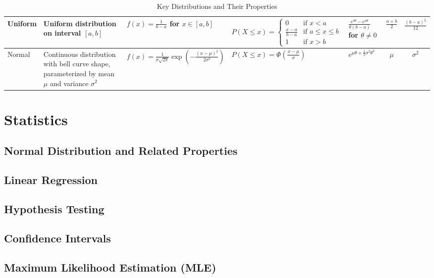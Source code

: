 \documentclass{article}
\begin{document}
\begin{table}[h]
\begin{tabular}{|l|p{3.5cm}|p{3.5cm}|p{3.5cm}|p{2.5cm}|c|c|}
\hline
Uniform &
Uniform distribution on interval $[a,b]$ &
$f(x) = \frac{1}{b-a}$ for $x \in [a,b]$ &
$P(X \leq x) = \begin{cases}
0 & \text{if } x < a \\
\frac{x-a}{b-a} & \text{if } a \leq x \leq b \\
1 & \text{if } x > b
\end{cases}$ &
$\frac{e^{b\theta} - e^{a\theta}}{\theta(b-a)}$ for $\theta \neq 0$ &
$\frac{a+b}{2}$ &
$\frac{(b-a)^2}{12}$ \\
\hline
Normal &
Continuous distribution with bell curve shape, parameterized by mean $\mu$ and variance $\sigma^2$ &
$f(x) = \frac{1}{\sigma\sqrt{2\pi}} \exp\left( -\frac{(x-\mu)^2}{2\sigma^2} \right)$ &
$P(X \leq x) = \Phi\left(\frac{x-\mu}{\sigma}\right)$ &
$e^{\mu\theta + \frac{1}{2} \sigma^2 \theta^2}$ &
$\mu$ &
$\sigma^2$ \\
\hline
\end{tabular}
\caption{Key Distributions and Their Properties}
\end{table}
\newpage




\section{Statistics}

\subsection{Normal Distribution and Related Properties}

\subsection{Linear Regression}

\subsection{Hypothesis Testing}

\subsection{Confidence Intervals}

\subsection{Maximum Likelihood Estimation (MLE)}
\end{document}
